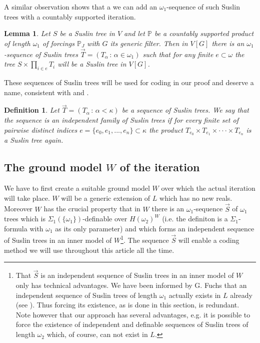 \documentclass[a4paper,11pt]{article}
\newtheorem{lemma}[theorem]{Lemma}
\newtheorem{definition}[theorem]{Definition}
\newcommand{\forceP}{\mathbb{P}}
\begin{document}
A similar observation shows that a we can add an $\omega_1$-sequence of
such Suslin trees with a countably supported iteration. 


\begin{lemma}\label{ManySuslinTrees}
 Let $S$ be a Suslin tree in $V$ and let $\forceP$ be a countably supported
 product of length $\omega_1$ of forcings $\forceP_J$ with $G$ its generic filter. Then in
 $V[G]$ there is an $\omega_1$-sequence of Suslin trees $\vec{T}=(T_{\alpha} \, : \, \alpha \in \omega_1)$ such
that for any finite $e \subset \omega$
the tree $S \times \prod_{i \in e} T_i$ will be a Suslin tree in $V[G]$.
\end{lemma}

These sequences of Suslin trees will be used for coding in our proof and deserve a name, consistent with \cite{FS} and \cite{Ho}.
\begin{definition}
 Let $\vec{T} = (T_{\alpha} \, : \, \alpha < \kappa)$ be a sequence of Suslin trees. We say that the sequence is an 
 independent family of Suslin trees if for every finite set of pairwise distinct indices $e= \{e_0, e_1,...,e_n\} \subset \kappa$ the product $T_{e_0} \times T_{e_1} \times \cdot \cdot \cdot \times T_{e_n}$ 
 is a Suslin tree again.
\end{definition}
\subsection{The ground model $W$ of the iteration}
We have to first create a suitable ground model $W$ over which the actual iteration will take place. $W$ will be a generic extension of $L$ which has no new reals. Moreover $W$ has the crucial property that in $W$ there is an $\omega_1$-sequence $\vec{S}$ of $\omega_1$ trees which is $\Sigma_1(\{\omega_1\})$-definable over $H(\omega_2)^W$ (i.e. the definiton is a $\Sigma_1$-formula with $\omega_1$ as its only parameter) and which forms an independent sequence of Suslin trees in an inner model of $W$\footnote{That $\vec{S}$ is an independent sequence of Suslin trees in an inner model of $W$ only has technical advantages. We have been informed by G. Fuchs that an independent sequence of Suslin trees of length $\omega_1$ actually exists in $L$ already (see \cite{FH}). Thus forcing its existence, as is done in this section, is redundant. Note however that our approach has several advantages, e.g. it is possible to force the existence of independent and definable sequences of Suslin trees of length $\omega_2$ which, of course, can not exist in $L$.  }. The sequence $\vec{S}$ will enable a coding method we will use throughout this article all the time.
\end{document}
